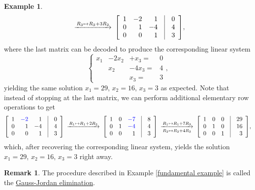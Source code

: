 \documentclass[12pt,letterpaper]{book}
\def\blue{\textcolor{blue}}
\numberwithin{equation}{section}
\theoremstyle{definition}
\newtheorem{example}[thm]{\textbf{Example}}
\newtheorem{remark}[thm]{\textbf{Remark}}
\begin{document}
\begin{example}
$$\begin{CD}
@>R_3\mapsto R_3+3R_2>>
\left[\begin{array}{rrr@{\quad}|@{\quad}r}1 & -2 & 1 & 0\\ 0 & 1 & -4& 4\\0 & 0 & 1 &  3 \end{array}\right]
\end{CD},$$
where the last matrix can be decoded to produce the corresponding linear system $$\left\{\begin{array}{rrrr}
x_1&-2x_2&+x_3=&0
\\ &x_2 &-4x_3=&4 \\ &&x_3=&3\end{array}\right.,$$
yielding the same solution $x_1=29$, $x_2=16$, $x_3=3$ as expected. Note that instead of stopping at the last matrix, we can perform additional elementary row operations to get
$$\begin{CD}
\left[\begin{array}{rrr@{\quad}|@{\quad}r}1&\blue{-2}&1& 0\\0&1&-4& 4
\\0&0&1& 3\end{array}\right] @>R_1\mapsto R_1+2R_2>> \left[\begin{array}{rrr@{\quad}|@{\quad}r}1&0&\blue{-7}&8\\0&1&\blue{-4}& 4
\\0&0&1& 3\end{array}\right] @>R_1\mapsto
R_1+7R_3>R_2\mapsto R_2+4R_3>
\left[\begin{array}{rrr@{\quad}|@{\quad}r}1&0&0& 29\\0&1&0& 16
\\0&0&1& 3\end{array}\right] \end{CD},$$
which, after recovering the corresponding linear system, yields the solution $x_1=29$, $x_2=16$, $x_3=3$  right away.
\end{example}

\begin{remark} The procedure described in Example \ref{fundamental example} is called the \ul{Gauss-Jordan
elimination}.
\end{remark}
\end{document}
